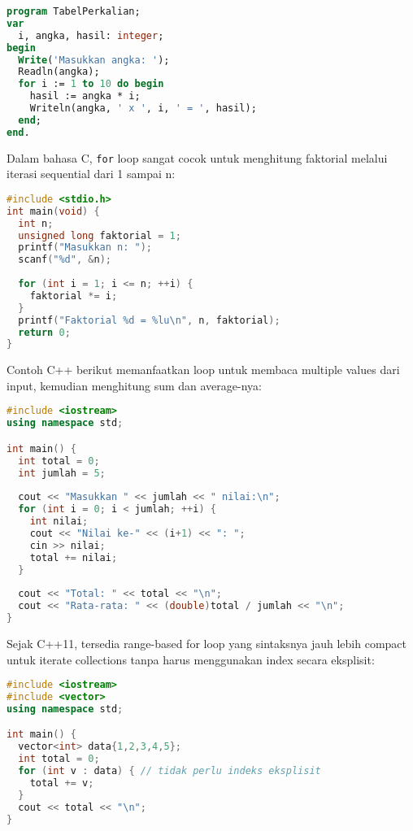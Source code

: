 \documentclass[../main.tex]{subfiles}
\begin{document}
\begin{lstlisting}[language=Pascal, caption={Cetak tabel perkalian dengan for (Pascal)}]
program TabelPerkalian;
var
  i, angka, hasil: integer;
begin
  Write('Masukkan angka: ');
  Readln(angka);
  for i := 1 to 10 do begin
    hasil := angka * i;
    Writeln(angka, ' x ', i, ' = ', hasil);
  end;
end.
\end{lstlisting}

Dalam bahasa C, \texttt{for} loop sangat cocok untuk menghitung faktorial melalui iterasi sequential dari 1 sampai n:

\begin{lstlisting}[language=C, caption={Hitung faktorial dengan for (C)}]
#include <stdio.h>
int main(void) {
  int n;
  unsigned long faktorial = 1;
  printf("Masukkan n: ");
  scanf("%d", &n);
  
  for (int i = 1; i <= n; ++i) {
    faktorial *= i;
  }
  printf("Faktorial %d = %lu\n", n, faktorial);
  return 0;
}
\end{lstlisting}

Contoh C++ berikut memanfaatkan loop untuk membaca multiple values dari input, kemudian menghitung sum dan average-nya:

\begin{lstlisting}[language=C++, caption={Loop for dengan hitung total (C++)}]
#include <iostream>
using namespace std;

int main() {
  int total = 0;
  int jumlah = 5;
  
  cout << "Masukkan " << jumlah << " nilai:\n";
  for (int i = 0; i < jumlah; ++i) {
    int nilai;
    cout << "Nilai ke-" << (i+1) << ": ";
    cin >> nilai;
    total += nilai;
  }
  
  cout << "Total: " << total << "\n";
  cout << "Rata-rata: " << (double)total / jumlah << "\n";
}
\end{lstlisting}

Sejak C++11, tersedia range-based for loop yang sintaksnya jauh lebih compact untuk iterate collections tanpa harus menggunakan index secara eksplisit:

\begin{lstlisting}[language=C++, caption={Range-based for pada koleksi (C++11+)}]
#include <iostream>
#include <vector>
using namespace std;

int main() {
  vector<int> data{1,2,3,4,5};
  int total = 0;
  for (int v : data) { // tidak perlu indeks eksplisit
    total += v;
  }
  cout << total << "\n";
}
\end{lstlisting}
\end{document}
